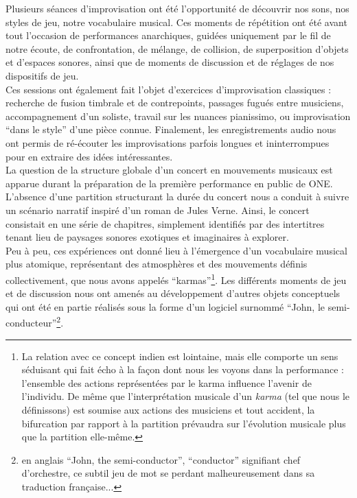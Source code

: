\indent Plusieurs séances d'improvisation ont été l'opportunité de découvrir nos sons, nos styles de jeu, notre vocabulaire musical. Ces moments de répétition ont été avant tout l'occasion de performances anarchiques, guidées uniquement par le fil de notre écoute, de confrontation, de mélange, de collision, de superposition d'objets et d'espaces sonores, ainsi que de moments de discussion et de réglages de nos dispositifs de jeu.\\
\indent Ces sessions ont également fait l'objet d'exercices d'improvisation classiques : recherche de fusion timbrale et de contrepoints, passages fugués entre musiciens, accompagnement d'un soliste, travail sur les nuances pianissimo, ou improvisation ``dans le style'' d'une pièce connue. Finalement, les enregistrements audio nous ont permis de ré-écouter les improvisations parfois longues et ininterrompues pour en extraire des idées intéressantes.\\
\indent La question de la structure globale d'un concert en mouvements musicaux est apparue durant la préparation de la première performance en public de ONE. L'absence d'une partition structurant la durée du concert nous a conduit à suivre un scénario narratif inspiré d'un roman de Jules Verne. Ainsi, le concert consistait en une série de chapitres, simplement identifiés par des intertitres tenant lieu de paysages sonores exotiques et imaginaires à explorer.\\
\indent Peu à peu, ces expériences ont donné lieu à l'émergence d'un vocabulaire musical plus atomique, représentant des atmosphères et des mouvements définis collectivement, que nous avons appelés ``karmas''\footnote{La relation avec ce concept indien est lointaine, mais elle comporte un sens séduisant qui fait écho à la façon dont nous les voyons dans la performance : l'ensemble des actions représentées par le karma influence l'avenir de l'individu. De même que l'interprétation musicale d'un \textit{karma} (tel que nous le définissons) est soumise aux actions des musiciens et tout accident, la bifurcation par rapport à la partition prévaudra sur l'évolution musicale plus que la partition elle-même.}. Les différents moments de jeu et de discussion nous ont amenés au développement d'autres objets conceptuels qui ont été en partie réalisés sous la forme d'un logiciel surnommé ``John, le semi-conducteur''\footnote{en anglais ``John, the semi-conductor'', ``conductor'' signifiant chef d'orchestre, ce subtil jeu de mot se perdant malheureusement dans sa traduction française...}.\\
